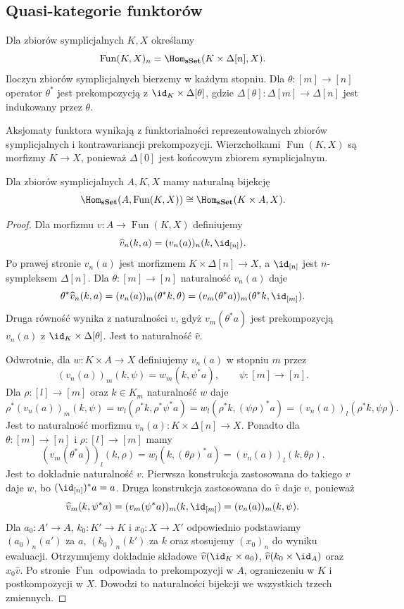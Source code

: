 \subsection{Quasi-kategorie funktorów}

\begin{definicja}\label{cat:def:quasicat-functor-complex}
Dla zbiorów symplicjalnych $K,X$ określamy
\[
 \operatorname{Fun}(K,X)_n=\Hom_{\mathbf{sSet}}(K\times\Delta[n],X).
\]
Iloczyn zbiorów symplicjalnych bierzemy w każdym stopniu. Dla $\theta:[m]\to[n]$ operator $\theta^*$ jest prekompozycją z $\id_K\times\Delta[\theta]$, gdzie $\Delta[\theta]:\Delta[m]\to\Delta[n]$ jest indukowany przez $\theta$.
\end{definicja}
Aksjomaty funktora wynikają z funktorialności reprezentowalnych zbiorów symplicjalnych i kontrawariancji prekompozycji. Wierzchołkami $\operatorname{Fun}(K,X)$ są morfizmy $K\to X$, ponieważ $\Delta[0]$ jest końcowym zbiorem symplicjalnym.

\begin{stwierdzenie}\label{cat:prop:simplicial-exponential-adjunction}
Dla zbiorów symplicjalnych $A,K,X$ mamy naturalną bijekcję
\[
 \Hom_{\mathbf{sSet}}(A,\operatorname{Fun}(K,X))
 \cong\Hom_{\mathbf{sSet}}(K\times A,X).
\]
\end{stwierdzenie}
\begin{proof}
Dla morfizmu $v:A\to\operatorname{Fun}(K,X)$ definiujemy
\[
 \widehat v_n(k,a)=(v_n(a))_n(k,\id_{[n]}).
\]
Po prawej stronie $v_n(a)$ jest morfizmem $K\times\Delta[n]\to X$, a $\id_{[n]}$ jest $n$-sympleksem $\Delta[n]$. Dla $\theta:[m]\to[n]$ naturalność $v_n(a)$ daje
\[
 \theta^*\widehat v_n(k,a)
 =(v_n(a))_m(\theta^*k,\theta)
 =(v_m(\theta^*a))_m(\theta^*k,\id_{[m]}).
\]
Druga równość wynika z naturalności $v$, gdyż $v_m(\theta^*a)$ jest prekompozycją $v_n(a)$ z $\id_K\times\Delta[\theta]$. Jest to naturalność $\widehat v$.

Odwrotnie, dla $w:K\times A\to X$ definiujemy $v_n(a)$ w stopniu $m$ przez
\[
 (v_n(a))_m(k,\psi)=w_m(k,\psi^*a),
 \qquad \psi:[m]\to[n].
\]
Dla $\rho:[l]\to[m]$ oraz $k\in K_m$ naturalność $w$ daje
\[
 \rho^*(v_n(a))_m(k,\psi)
 =w_l(\rho^*k,\rho^*\psi^*a)
 =w_l(\rho^*k,(\psi\rho)^*a)
 =(v_n(a))_l(\rho^*k,\psi\rho).
\]
Jest to naturalność morfizmu $v_n(a):K\times\Delta[n]\to X$. Ponadto dla $\theta:[m]\to[n]$ i $\rho:[l]\to[m]$ mamy
\[
 (v_m(\theta^*a))_l(k,\rho)
 =w_l(k,(\theta\rho)^*a)
 =(v_n(a))_l(k,\theta\rho).
\]
Jest to dokładnie naturalność $v$. Pierwsza konstrukcja zastosowana do takiego $v$ daje $w$, bo $(\id_{[n]})^*a=a$. Druga konstrukcja zastosowana do $\widehat v$ daje $v$, ponieważ
\[
 \widehat v_m(k,\psi^*a)
 =(v_m(\psi^*a))_m(k,\id_{[m]})
 =(v_n(a))_m(k,\psi).
\]
Dla $a_0:A'\to A$, $k_0:K'\to K$ i $x_0:X\to X'$ odpowiednio podstawiamy $(a_0)_n(a')$ za $a$, $(k_0)_n(k')$ za $k$ oraz stosujemy $(x_0)_n$ do wyniku ewaluacji. Otrzymujemy dokładnie składowe $\widehat v(\id_K\times a_0)$, $\widehat v(k_0\times\id_A)$ oraz $x_0\widehat v$. Po stronie $\operatorname{Fun}$ odpowiada to prekompozycji w $A$, ograniczeniu w $K$ i postkompozycji w $X$. Dowodzi to naturalności bijekcji we wszystkich trzech zmiennych.
\end{proof}


